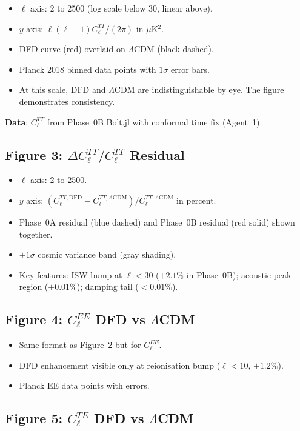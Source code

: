 \documentclass[11pt,a4paper]{article}
\begin{document}
\begin{itemize}
\item $\ell$ axis: 2 to 2500 (log scale below 30, linear above).
\item $y$ axis: $\ell(\ell+1)C_\ell^{TT}/(2\pi)$ in $\mu$K$^2$.
\item DFD curve (red) overlaid on $\Lambda$CDM (black dashed).
\item Planck 2018 binned data points with $1\sigma$ error bars.
\item At this scale, DFD and $\Lambda$CDM are indistinguishable by eye. The figure demonstrates consistency.
\end{itemize}

\textbf{Data}: $C_\ell^{TT}$ from Phase~0B Bolt.jl with conformal time fix (Agent~1).

\subsection{Figure 3: $\Delta C_\ell^{TT}/C_\ell^{TT}$ Residual}

\begin{itemize}
\item $\ell$ axis: 2 to 2500.
\item $y$ axis: $(C_\ell^{TT,\mathrm{DFD}} - C_\ell^{TT,\Lambda\mathrm{CDM}})/C_\ell^{TT,\Lambda\mathrm{CDM}}$ in percent.
\item Phase~0A residual (blue dashed) and Phase~0B residual (red solid) shown together.
\item $\pm 1\sigma$ cosmic variance band (gray shading).
\item Key features: ISW bump at $\ell < 30$ ($+2.1\%$ in Phase~0B); acoustic peak region ($+0.01\%$); damping tail ($< 0.01\%$).
\end{itemize}

\subsection{Figure 4: $C_\ell^{EE}$ DFD vs $\Lambda$CDM}

\begin{itemize}
\item Same format as Figure~2 but for $C_\ell^{EE}$.
\item DFD enhancement visible only at reionisation bump ($\ell < 10$, $+1.2\%$).
\item Planck EE data points with errors.
\end{itemize}

\subsection{Figure 5: $C_\ell^{TE}$ DFD vs $\Lambda$CDM}
\end{document}
